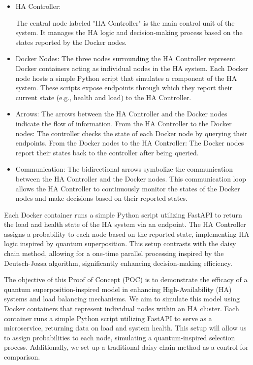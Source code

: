 \documentclass[12pt]{article}
\begin{document}
    \begin{itemize}
        \item HA Controller:
    
        The central node labeled "HA Controller" is the main control unit of the system.
        It manages the HA logic and decision-making process based on the states reported by the Docker nodes.

    \item Docker Nodes:
        The three nodes surrounding the HA Controller represent Docker containers acting as individual nodes in the HA system.
        Each Docker node hosts a simple Python script that simulates a component of the HA system.
        These scripts expose endpoints through which they report their current state (e.g., health and load) to the HA Controller.

    \item Arrows:
        The arrows between the HA Controller and the Docker nodes indicate the flow of information.
        From the HA Controller to the Docker nodes: The controller checks the state of each Docker node by querying their endpoints.
        From the Docker nodes to the HA Controller: The Docker nodes report their states back to the controller after being queried.

   \item  Communication:
        The bidirectional arrows symbolize the communication between the HA Controller and the Docker nodes.
        This communication loop allows the HA Controller to continuously monitor the states of the Docker nodes and make decisions based on their reported states.
\end{itemize}
Each Docker container runs a simple Python script utilizing FastAPI to return the load and health state of the HA system via an endpoint. The HA Controller assigns a probability to each node based on the reported state, implementing HA logic inspired by quantum superposition. This setup contrasts with the daisy chain method, allowing for a one-time parallel processing inspired by the Deutsch-Jozsa algorithm, significantly enhancing decision-making efficiency.


The objective of this Proof of Concept (POC) is to demonstrate the efficacy of a quantum superposition-inspired model in enhancing High-Availability (HA) systems and load balancing mechanisms. We aim to simulate this model using Docker containers that represent individual nodes within an HA cluster. Each container runs a simple Python script utilizing FastAPI to serve as a microservice, returning data on load and system health. This setup will allow us to assign probabilities to each node, simulating a quantum-inspired selection process. Additionally, we set up a traditional daisy chain method as a control for comparison.
\end{document}
